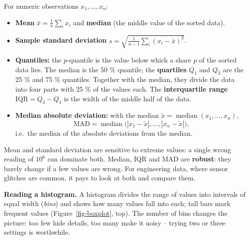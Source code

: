 \documentclass[
  letterpaper,
  DIV=11,
  numbers=noendperiod]{scrreprt}
\providecommand{\tightlist}{%
  \setlength{\itemsep}{0pt}\setlength{\parskip}{0pt}}\usepackage{longtable,booktabs,array}
\begin{document}
\begin{tcolorbox}[enhanced jigsaw, left=2mm, title=\textcolor{quarto-callout-note-color}{\faInfo}\hspace{0.5em}{Definition: Location and spread}, opacityback=0, breakable, rightrule=.15mm, arc=.35mm, toptitle=1mm, colbacktitle=quarto-callout-note-color!10!white, opacitybacktitle=0.6, coltitle=black, colframe=quarto-callout-note-color-frame, bottomrule=.15mm, leftrule=.75mm, bottomtitle=1mm, titlerule=0mm, toprule=.15mm, colback=white]

For numeric observations \(x_1, \dots, x_n\):

\begin{itemize}
\tightlist
\item
  \textbf{Mean} \(\bar x = \frac{1}{n}\sum_i x_i\) and \textbf{median}
  (the middle value of the sorted data).
\item
  \textbf{Sample standard deviation}
  \(s = \sqrt{\frac{1}{n-1}\sum_i (x_i - \bar x)^2}\).
\item
  \textbf{Quantiles:} the \(p\)-quantile is the value below which a
  share \(p\) of the sorted data lies. The median is the 50 \% quantile;
  the \textbf{quartiles} \(Q_1\) and \(Q_3\) are the 25 \% and 75 \%
  quantiles. Together with the median, they divide the data into four
  parts with 25 \% of the values each. The \textbf{interquartile range}
  \(\text{IQR} = Q_3 - Q_1\) is the width of the middle half of the
  data.
\item
  \textbf{Median absolute deviation:} with the median
  \(\tilde x = \operatorname{median}(x_1, \dots, x_n)\),
  \[\text{MAD} = \operatorname{median}\big(|x_1 - \tilde x|, \dots, |x_n - \tilde x|\big),\]
  i.e.~the median of the absolute deviations from the median.
\end{itemize}

\end{tcolorbox}

Mean and standard deviation are sensitive to extreme values: a single
wrong reading of \(10^6\) can dominate both. Median, IQR and MAD are
\textbf{robust}: they barely change if a few values are wrong. For
engineering data, where sensor glitches are common, it pays to look at
both and compare them.

\textbf{Reading a histogram.} A histogram divides the range of values
into intervals of equal width (\emph{bins}) and shows how many values
fall into each; tall bars mark frequent values
(Figure~\ref{fig-boxplot}, top). The number of bins changes the picture:
too few hide details, too many make it noisy -- trying two or three
settings is worthwhile.
\end{document}
